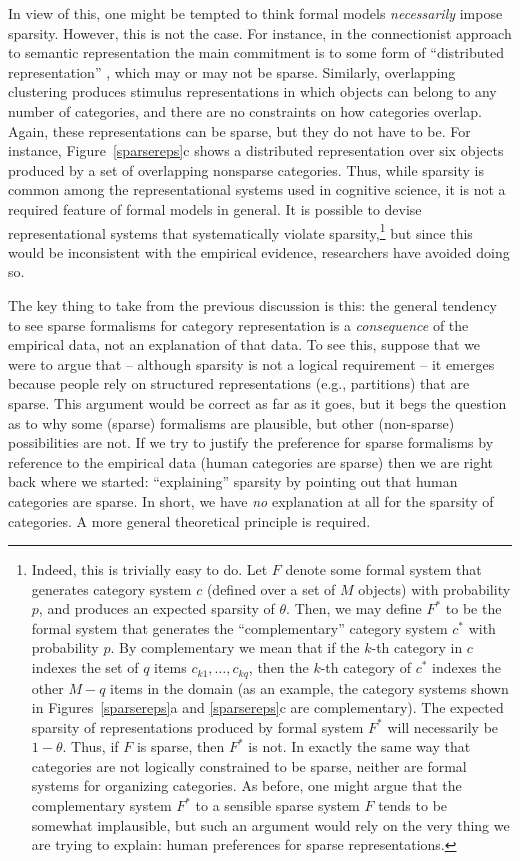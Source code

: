\documentclass{apa}
\begin{document}
In view of this, one might be tempted to think formal models {\it necessarily} impose sparsity. However, this is not the case. For instance, in the connectionist approach to semantic representation the main commitment is to some form of ``distributed representation'' \cite{rogers04}, which may or may not be sparse. Similarly, overlapping clustering \cite{Shepard1979} produces stimulus representations in which objects can belong to any number of categories, and there are no constraints on how categories overlap. Again, these representations can be sparse, but they do not have to be. For instance, Figure~\ref{sparsereps}c shows a distributed representation over six objects produced by a set of overlapping nonsparse categories. Thus, while sparsity is common among the representational systems used in cognitive science, it is not a required feature of formal models in general. It is possible to devise representational systems that systematically violate sparsity,\footnote{Indeed, this is trivially easy to do. Let $F$ denote some formal system that generates category system $c$ (defined over a set of $M$ objects) with probability $p$, and produces an expected sparsity of $\theta$. Then, we may define $F^*$ to be the formal system that generates the ``complementary'' category system $c^*$ with probability $p$. By complementary we mean that if the $k$-th category in $c$ indexes the set of $q$ items $c_{k1},\ldots,c_{kq}$, then the $k$-th category of $c^*$ indexes the other $M-q$ items in the domain (as an example, the category systems shown in Figures~\ref{sparsereps}a and \ref{sparsereps}c are complementary). The expected sparsity of representations produced by formal system $F^*$ will necessarily be $1-\theta$. Thus, if $F$ is sparse, then $F^*$ is not. In exactly the same way that categories are not logically constrained to be sparse, neither are formal systems for organizing categories. As before, one might argue that the complementary system $F^*$ to a sensible sparse system $F$ tends to be somewhat implausible, but such an argument would rely on the very thing we are trying to explain: human preferences for sparse representations.} but since this would be inconsistent with the empirical evidence, researchers have avoided doing so.

The key thing to take from the previous discussion is this: the general tendency to see sparse formalisms for category representation is a {\it consequence} of the empirical data, not an explanation of that data. To see this, suppose that we were to argue that -- although sparsity is not a logical requirement -- it emerges because people rely on structured representations (e.g., partitions) that are sparse. This argument would be correct as far as it goes, but it begs the question as to why some (sparse) formalisms are plausible, but other (non-sparse) possibilities are not. If we try to justify the preference for sparse formalisms by reference to the empirical data (human categories are sparse) then we are right back where we started: ``explaining'' sparsity by pointing out that human categories are sparse. In short, we have {\it no} explanation at all for the sparsity of categories. A more general theoretical principle is required.
\end{document}
